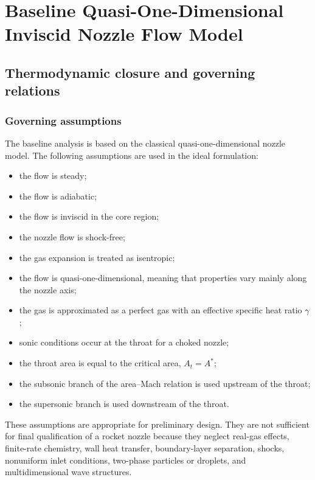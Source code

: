 \section{Baseline Quasi-One-Dimensional Inviscid Nozzle Flow Model}
\label{sec:3}

\subsection{Thermodynamic closure and governing relations}

\subsubsection{Governing assumptions}

The baseline analysis is based on the classical quasi-one-dimensional nozzle model. The following assumptions are used in the ideal formulation:
\begin{itemize}
    \item the flow is steady;
    \item the flow is adiabatic;
    \item the flow is inviscid in the core region;
    \item the nozzle flow is shock-free;
    \item the gas expansion is treated as isentropic;
    \item the flow is quasi-one-dimensional, meaning that properties vary mainly along the nozzle axis;
    \item the gas is approximated as a perfect gas with an effective specific heat ratio $\gamma$;
    \item sonic conditions occur at the throat for a choked nozzle;
    \item the throat area is equal to the critical area, $A_t=A^*$;
    \item the subsonic branch of the area--Mach relation is used upstream of the throat;
    \item the supersonic branch is used downstream of the throat.
\end{itemize}

These assumptions are appropriate for preliminary design. They are not sufficient for final qualification of a rocket nozzle because they neglect real-gas effects, finite-rate chemistry, wall heat transfer, boundary-layer separation, shocks, nonuniform inlet conditions, two-phase particles or droplets, and multidimensional wave structures.

